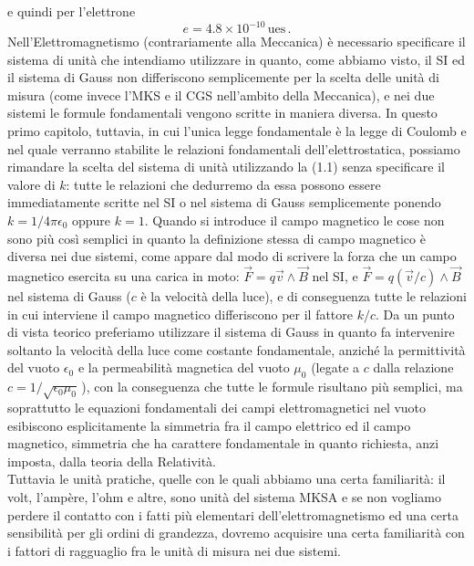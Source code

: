e quindi per l'elettrone
\begin{equation}
e=4.8\times10^{-10}\,\mathrm{ues}\,.
\tag{1.2'}
\end{equation}
Nell'Elettromagnetismo (contrariamente alla Meccanica) è necessario specificare il sistema di unità che intendiamo utilizzare in quanto, come abbiamo visto, il SI ed il sistema di Gauss non differiscono semplicemente per la scelta delle unità di misura (come invece l'MKS e il CGS nell'ambito della Meccanica), e nei due sistemi le formule fondamentali vengono scritte in maniera diversa. In questo primo capitolo, tuttavia, in cui l'unica legge fondamentale è la legge di Coulomb e nel quale verranno stabilite le relazioni fondamentali dell'elettrostatica, possiamo rimandare la scelta del sistema di unità utilizzando la (1.1) senza specificare il valore di $k$: tutte le relazioni che dedurremo da essa possono essere immediatamente scritte nel SI o nel sistema di Gauss semplicemente ponendo $k=1/4\pi\epsilon_0$ oppure $k=1$. Quando si introduce il campo magnetico le cose non sono più così semplici in quanto la definizione stessa di campo magnetico è diversa nei due sistemi, come appare dal modo di scrivere la forza che un campo magnetico esercita su una carica in moto: $\vec F=q\vec v\wedge\vec B$ nel SI, e $\vec F=q(\vec v/c)\wedge\vec B$ nel sistema di Gauss ($c$ è la velocità della luce), e di conseguenza tutte le relazioni in cui interviene il campo magnetico differiscono per il fattore $k/c$. Da un punto di vista teorico preferiamo utilizzare il sistema di Gauss in quanto fa intervenire soltanto la velocità della luce come costante fondamentale, anziché la permittività del vuoto $\epsilon_0$ e la permeabilità magnetica del vuoto $\mu_0$ (legate a $c$ dalla relazione $c=1/\sqrt{\epsilon_0\mu_0}$\,), con la conseguenza che tutte le formule risultano più semplici, ma soprattutto le equazioni fondamentali dei campi elettromagnetici nel vuoto esibiscono esplicitamente la simmetria fra il campo elettrico ed il campo magnetico, simmetria che ha carattere fondamentale in quanto richiesta, anzi imposta, dalla teoria della Relatività.\\
Tuttavia le unità pratiche, quelle con le quali abbiamo una certa familiarità: il volt, l'ampère, l'ohm e altre, sono unità del sistema MKSA e se non vogliamo perdere il contatto con i fatti più elementari dell'elettromagnetismo ed una certa sensibilità per gli ordini di grandezza, dovremo acquisire una certa familiarità con i fattori di ragguaglio fra le unità di misura nei due sistemi.

